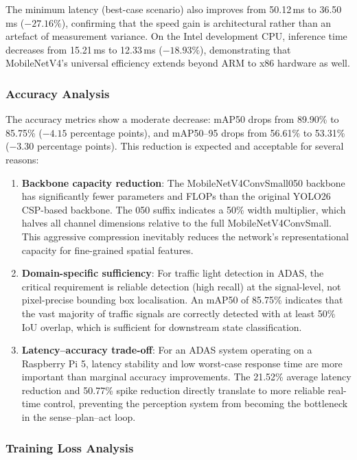 The minimum latency (best-case scenario) also improves from 50.12\,ms to 36.50\,ms ($-27.16\%$), confirming that the speed gain is architectural rather than an artefact of measurement variance. On the Intel development CPU, inference time decreases from 15.21\,ms to 12.33\,ms ($-18.93\%$), demonstrating that MobileNetV4's universal efficiency extends beyond ARM to x86 hardware as well.

\subsubsection{Accuracy Analysis}

The accuracy metrics show a moderate decrease: mAP50 drops from 89.90\% to 85.75\% ($-4.15$ percentage points), and mAP50--95 drops from 56.61\% to 53.31\% ($-3.30$ percentage points). This reduction is expected and acceptable for several reasons:

\begin{enumerate}
    \item \textbf{Backbone capacity reduction}: The MobileNetV4ConvSmall050 backbone has significantly fewer parameters and FLOPs than the original YOLO26 CSP-based backbone. The 050 suffix indicates a 50\% width multiplier, which halves all channel dimensions relative to the full MobileNetV4ConvSmall. This aggressive compression inevitably reduces the network's representational capacity for fine-grained spatial features.
    \item \textbf{Domain-specific sufficiency}: For traffic light detection in ADAS, the critical requirement is reliable detection (high recall) at the signal-level, not pixel-precise bounding box localisation. An mAP50 of 85.75\% indicates that the vast majority of traffic signals are correctly detected with at least 50\% IoU overlap, which is sufficient for downstream state classification.
    \item \textbf{Latency--accuracy trade-off}: For an ADAS system operating on a Raspberry Pi 5, latency stability and low worst-case response time are more important than marginal accuracy improvements. The 21.52\% average latency reduction and 50.77\% spike reduction directly translate to more reliable real-time control, preventing the perception system from becoming the bottleneck in the sense--plan--act loop.
\end{enumerate}
\subsubsection{Training Loss Analysis}

